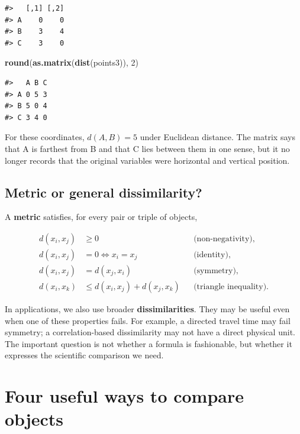 \documentclass[
  english,
]{article}
\newenvironment{Shaded}{\begin{snugshade}}{\end{snugshade}}
\newcommand{\DecValTok}[1]{\textcolor[rgb]{0.00,0.00,0.81}{#1}}
\newcommand{\FunctionTok}[1]{\textcolor[rgb]{0.13,0.29,0.53}{\textbf{#1}}}
\newcommand{\NormalTok}[1]{#1}
\begin{document}
\begin{verbatim}
#>   [,1] [,2]
#> A    0    0
#> B    3    4
#> C    3    0
\end{verbatim}

\begin{Shaded}
\begin{Highlighting}[]
\FunctionTok{round}\NormalTok{(}\FunctionTok{as.matrix}\NormalTok{(}\FunctionTok{dist}\NormalTok{(points3)), }\DecValTok{2}\NormalTok{)}
\end{Highlighting}
\end{Shaded}

\begin{verbatim}
#>   A B C
#> A 0 5 3
#> B 5 0 4
#> C 3 4 0
\end{verbatim}

For these coordinates, \(d(A,B)=5\) under Euclidean distance. The matrix
says that A is farthest from B and that C lies between them in one
sense, but it no longer records that the original variables were
horizontal and vertical position.

\subsection{Metric or general
dissimilarity?}\label{metric-or-general-dissimilarity}

A \textbf{metric} satisfies, for every pair or triple of objects,

\[\begin{aligned}
d(x_i,x_j)&\geq 0 &&\text{(non-negativity)},\\
d(x_i,x_j)&=0 \Leftrightarrow x_i=x_j &&\text{(identity)},\\
d(x_i,x_j)&=d(x_j,x_i) &&\text{(symmetry)},\\
d(x_i,x_k)&\leq d(x_i,x_j)+d(x_j,x_k) &&\text{(triangle inequality)}.
\end{aligned}\]

In applications, we also use broader \textbf{dissimilarities}. They may
be useful even when one of these properties fails. For example, a
directed travel time may fail symmetry; a correlation-based
dissimilarity may not have a direct physical unit. The important
question is not whether a formula is fashionable, but whether it
expresses the scientific comparison we need.

\section{Four useful ways to compare
objects}\label{four-useful-ways-to-compare-objects}
\end{document}
